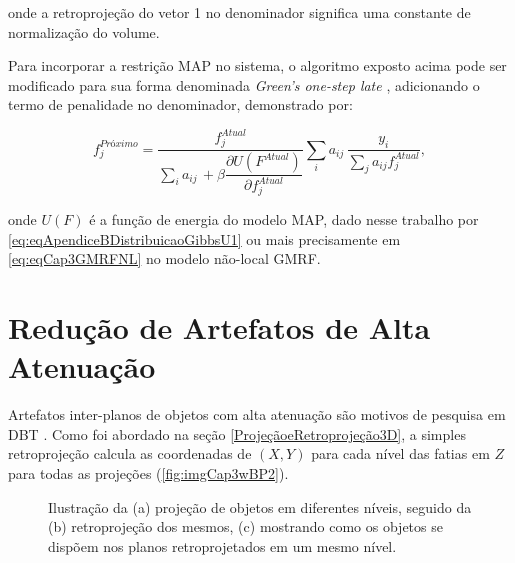 {{\noindent onde a retroprojeção do vetor 1 no denominador significa uma constante de normalização do volume.

Para incorporar a restrição \acs{MAP} no sistema, o algoritmo exposto acima pode ser modificado para sua forma denominada \textit{Green’s one-step late} \cite[p. 151]{zeng2010medical}, adicionando o termo de penalidade no denominador, demonstrado por: 

 \begin{equation}
 f_{j}^{Próximo} = \dfrac{f_{j}^{Atual}}{\sum_{i}^{} a_{ij} \, + \beta \dfrac{\partial U(F^{Atual})}{ \partial f_{j}^{Atual}}} \sum_{i}^{} a_{ij} \, \dfrac{y_{i}}{\sum_{j}^{} a_{ij}f_{j}^{Atual}},
 \label{eq:eqCap3MLEMMAP}
 \end{equation}
 
 \noindent onde $U(F)$ é a função de energia do modelo \acs{MAP}, dado nesse trabalho por \eqref{eq:eqApendiceBDistribuicaoGibbsU1} ou mais precisamente em \eqref{eq:eqCap3GMRFNL} no modelo não-local \acs{GMRF}.


\section{Redução de Artefatos de Alta Atenuação} \label{ReduçãodeArtefatosdeAltaAtenuação}

Artefatos inter-planos de objetos com alta atenuação são motivos de pesquisa em \acs{DBT} \cite{hu2008image,levakhina2013weighted,borges2017metal}. Como foi abordado na seção \ref{ProjeçãoeRetroprojeção3D}, a simples retroprojeção calcula as coordenadas de $(X,Y)$ para cada nível das fatias em $Z$ para todas as projeções (\ref{fig:imgCap3wBP2}). 	

\begin{figure}[H]
	\centering
	
	\caption{Ilustração da (a) projeção de objetos em diferentes níveis, seguido da (b) retroprojeção dos mesmos, (c) mostrando como os objetos se dispõem nos planos retroprojetados em um mesmo nível.}
	
	\hfil
	\hfil
		

\end{figure}}}
